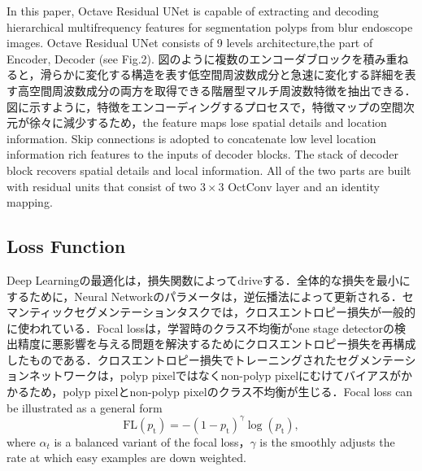 \documentclass{article}
\begin{document}
In this paper, Octave Residual UNet is capable of extracting and decoding hierarchical multifrequency features for  segmentation polyps from blur endoscope images. Octave Residual UNet consists of 9 levels architecture,the part of Encoder, Decoder (see Fig.2).
図のように複数のエンコーダブロックを積み重ねると，滑らかに変化する構造を表す低空間周波数成分と急速に変化する詳細を表す高空間周波数成分の両方を取得できる階層型マルチ周波数特徴を抽出できる．図に示すように，特徴をエンコーディングするプロセスで，特徴マップの空間次元が徐々に減少するため，the feature maps lose spatial details and location information. Skip connections  is adopted to concatenate low level location information rich features to the inputs of decoder blocks. The stack of decoder block recovers spatial details and local information. All of the two parts are built with residual units that consist of two $3\times3$ OctConv layer and an identity mapping.


\subsection{Loss Function}
Deep Learningの最適化は，損失関数によってdriveする．全体的な損失を最小にするために，Neural Networkのパラメータは，逆伝播法によって更新される．セマンティックセグメンテーションタスクでは，クロスエントロピー損失が一般的に使われている．Focal lossは，学習時のクラス不均衡がone stage detectorの検出精度に悪影響を与える問題を解決するためにクロスエントロピー損失を再構成したものである．クロスエントロピー損失でトレーニングされたセグメンテーションネットワークは，polyp pixelではなくnon-polyp pixelにむけてバイアスがかかるため，polyp pixelとnon-polyp pixelのクラス不均衡が生じる．Focal loss can be illustrated as a general form  
\begin{equation}
\mathrm{FL}\left(p_{\mathrm{t}}\right)=-\left(1-p_{\mathrm{t}}\right)^{\gamma} \log \left(p_{\mathrm{t}}\right),
\end{equation}
where $\alpha_t$ is a balanced variant of the focal loss，$\gamma$ is the smoothly adjusts the rate at which easy examples are down weighted.
\end{document}
